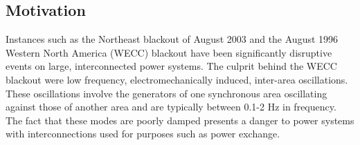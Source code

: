\documentclass[a4paper, 10 pt, conference]{IEEEtran}
\begin{document}
\subsection{Motivation}
Instances such as the Northeast blackout of August 2003 and the August 1996 Western North America (WECC)\cite{NAERC} blackout have been significantly disruptive events on large, interconnected power systems. The culprit behind the WECC blackout were low frequency, electromechanically induced, inter-area oscillations\cite{NAERC}. These oscillations involve the generators of one synchronous area oscillating against those of another area and are typically between 0.1-2 Hz in frequency. The fact that these modes are poorly damped\cite{WAPODNorway} presents a danger to power systems with interconnections used for purposes such as power exchange.
\end{document}
